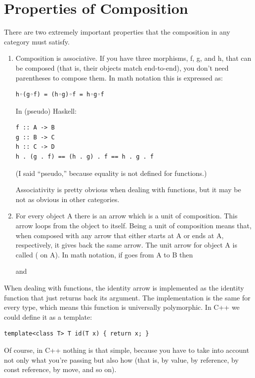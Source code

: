 \section{Properties of Composition}\label{properties-of-composition}

There are two extremely important properties that the composition in any
category must satisfy.

\begin{enumerate}
\item
Composition is associative. If you have three morphisms, f, g, and h,
that can be composed (that is, their objects match end-to-end), you
don't need parentheses to compose them. In math notation this is
expressed as:

\begin{verbatim}
h◦(g◦f) = (h◦g)◦f = h◦g◦f
\end{verbatim}
In (pseudo) Haskell:

\begin{verbatim}
f :: A -> B
g :: B -> C
h :: C -> D
h . (g . f) == (h . g) . f == h . g . f
\end{verbatim}
(I said ``pseudo,'' because equality is not defined for functions.)

Associativity is pretty obvious when dealing with functions, but it may
be not as obvious in other categories.

\item
For every object A there is an arrow which is a unit of composition.
This arrow loops from the object to itself. Being a unit of composition
means that, when composed with any arrow that either starts at A or ends
at A, respectively, it gives back the same arrow. The unit arrow for
object A is called  ( on A). In math
notation, if  goes from A to B then


and

\end{enumerate}
When dealing with functions, the identity arrow is implemented as the
identity function that just returns back its argument. The
implementation is the same for every type, which means this function is
universally polymorphic. In C++ we could define it as a template:

\begin{verbatim}
template<class T> T id(T x) { return x; }
\end{verbatim}
Of course, in C++ nothing is that simple, because you have to take into
account not only what you're passing but also how (that is, by value, by
reference, by const reference, by move, and so on).

